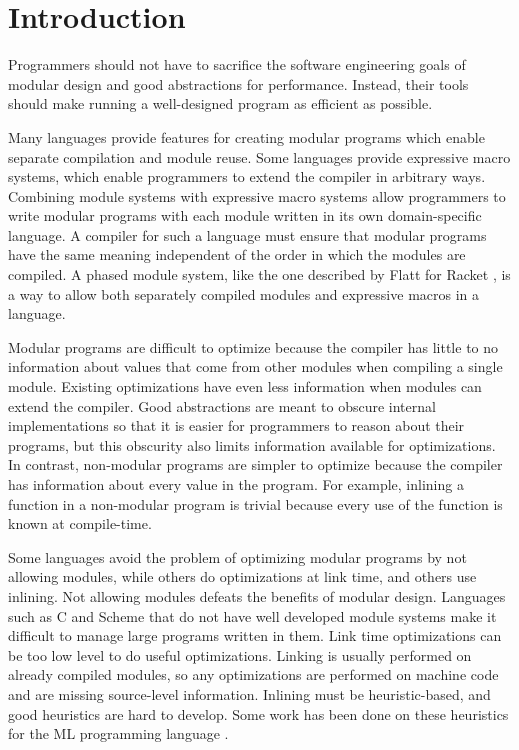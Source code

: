 \chapter{Introduction}
\label{chap:introduction}

Programmers should not have to sacrifice the software engineering goals of modular design and good abstractions for performance. 
Instead, their tools should make running a well-designed program as efficient as possible. 

Many languages provide features for creating modular programs which enable separate compilation and module reuse.
Some languages provide expressive macro systems, which enable programmers to extend the compiler in arbitrary ways.
Combining module systems with expressive macro systems allow programmers to write modular programs with each module written in its own domain-specific language.
A compiler for such a language must ensure that modular programs have the same meaning independent of the order in which the modules are compiled.
A phased module system, like the one described by Flatt for Racket \cite{Flatt}, is a way to allow both separately compiled modules and expressive macros in a language.

Modular programs are difficult to optimize because the compiler has little to no information about values that come from other modules when compiling a single module.
Existing optimizations have even less information when modules can extend the compiler. 
Good abstractions are meant to obscure internal implementations so that it is easier for programmers to reason about their programs, but this obscurity also limits information available for optimizations.  
In contrast, non-modular programs are simpler to optimize because the compiler has information about every value in the program.
For example, inlining a function in a non-modular program is trivial because every use of the function is known at compile-time.

Some languages avoid the problem of optimizing modular programs by not allowing modules, while others do optimizations at link time, and others use inlining. 
Not allowing modules defeats the benefits of modular design. 
Languages such as C and Scheme that do not have well developed module systems make it difficult to manage large programs written in them.
Link time optimizations can be too low level to do useful optimizations.
Linking is usually performed on already compiled modules, so any optimizations are performed on machine code and are missing source-level information.
Inlining must be heuristic-based, and good heuristics are hard to develop. 
Some work has been done on these heuristics for the ML programming language \cite{258960}.

